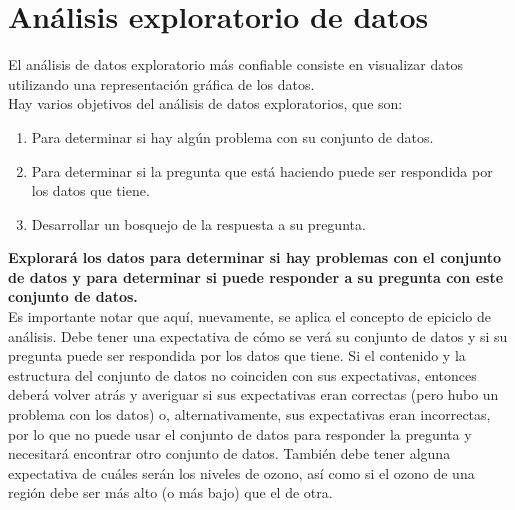 \documentclass[10pt]{book}
\begin{document}
\chapter{Análisis exploratorio de datos}
El análisis de datos exploratorio más confiable consiste en visualizar datos utilizando una representación gráfica de los datos.\\
Hay varios objetivos del análisis de datos exploratorios, que son: 
\begin{enumerate}[\bfseries 1.]
    \item Para determinar si hay algún problema con su conjunto de datos. 
    \item Para determinar si la pregunta que está haciendo puede ser respondida por los datos que tiene.
    \item Desarrollar un bosquejo de la respuesta a su pregunta.
\end{enumerate}
\textbf{Explorará los datos para determinar si hay problemas con el conjunto de datos y para determinar si puede responder a su pregunta con este conjunto de datos.}\\
Es importante notar que aquí, nuevamente, se aplica el concepto de epiciclo de análisis. Debe tener una expectativa de cómo se verá su conjunto de datos y si su pregunta puede ser respondida por los datos que tiene. Si el contenido y la estructura del conjunto de datos no coinciden con sus expectativas, entonces deberá volver atrás y averiguar si sus expectativas eran correctas (pero hubo un problema con los datos) o, alternativamente, sus expectativas eran incorrectas, por lo que no puede usar el conjunto de datos para responder la pregunta y necesitará encontrar otro conjunto de datos. También debe tener alguna expectativa de cuáles serán los niveles de ozono, así como si el ozono de una región debe ser más alto (o más bajo) que el de otra.\\
\end{document}
